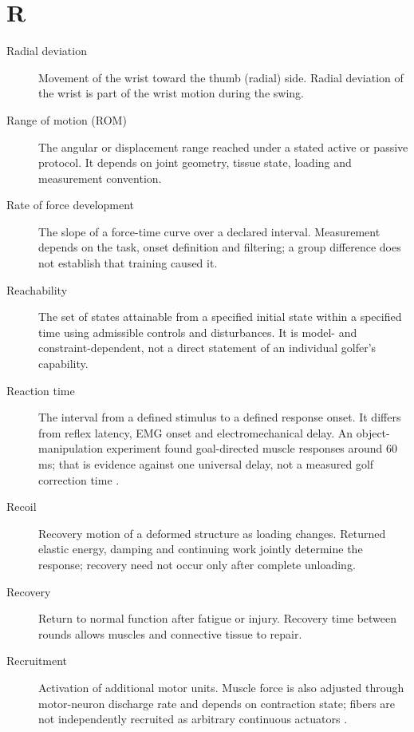 \section*{R}
\begin{description}

\item[Radial deviation] Movement of the wrist toward the thumb (radial) side. Radial deviation of the wrist is part of the wrist motion during the swing.

\item[Range of motion (ROM)] The angular or displacement range reached under a stated active or passive protocol. It depends on joint geometry, tissue state, loading and measurement convention.

\item[Rate of force development] The slope of a force-time curve over a declared interval. Measurement depends on the task, onset definition and filtering; a group difference does not establish that training caused it.

\item[Reachability] The set of states attainable from a specified initial state within a specified time using admissible controls and disturbances. It is model- and constraint-dependent, not a direct statement of an individual golfer's capability.

\item[Reaction time] The interval from a defined stimulus to a defined response onset. It differs from reflex latency, EMG onset and electromechanical delay. An object-manipulation experiment found goal-directed muscle responses around 60 ms; that is evidence against one universal delay, not a measured golf correction time \citep{glossaryFeedback2016}.

\item[Recoil] Recovery motion of a deformed structure as loading changes. Returned elastic energy, damping and continuing work jointly determine the response; recovery need not occur only after complete unloading.

\item[Recovery] Return to normal function after fatigue or injury. Recovery time between rounds allows muscles and connective tissue to repair.

\item[Recruitment] Activation of additional motor units. Muscle force is also adjusted through motor-neuron discharge rate and depends on contraction state; fibers are not independently recruited as arbitrary continuous actuators \citep{glossaryMuscleTension}.


\end{description}
